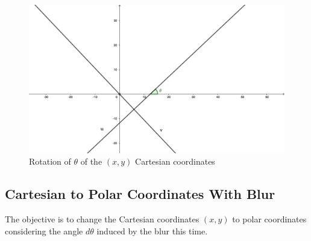 \documentclass{article}
\begin{document}
\begin{figure}[ht!]
\centering
\includegraphics[width=120mm]{Images/PolarSystem.pdf}
\caption{Rotation of $\theta$ of the $(x, y)$ Cartesian coordinates
\label{fig:Polar_System}}
\end{figure}


\subsection{Cartesian to Polar Coordinates With Blur}
The objective is to change the Cartesian coordinates $(x, y)$ to polar coordinates considering the angle $d\theta$ induced by the blur this time.
\end{document}
